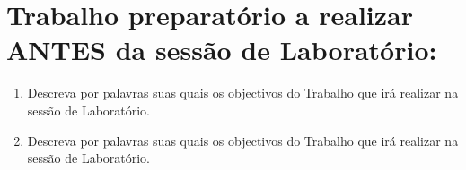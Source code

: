 \documentclass[a4paper,12pt]{article}  %
\begin{document}
\section{\sf Trabalho preparatório a realizar  ANTES da sessão de Laboratório:}
\begin{enumerate}
\item Descreva por palavras suas quais os objectivos do Trabalho que irá realizar na sessão de Laboratório.

\item Descreva por palavras suas quais os objectivos do Trabalho que irá realizar na sessão de Laboratório.
\end{enumerate}

\noindent\underline{\makebox[\textwidth][r]{~}} \\
\noindent\underline{\makebox[\textwidth][r]{~}} \\
\noindent\underline{\makebox[\textwidth][r]{~}} \\
\noindent\underline{\makebox[\textwidth][r]{~}} \\
\noindent\underline{\makebox[\textwidth][r]{~}} \\
\noindent\underline{\makebox[\textwidth][r]{~}} \\
\noindent\underline{\makebox[\textwidth][r]{~}} \\
\end{document}
